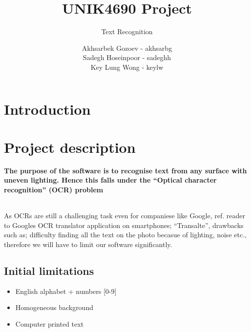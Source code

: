 \documentclass[11pt,a4paper,UKenglish]{article}
\title{UNIK4690 Project}
\subtitle{Text Recognition}
\author{
  Akhsarbek Gozoev  - akhsarbg \\
  Sadegh Hoseinpoor - sadeghh\\
  Key Lung Wong - keylw
}
\begin{document}
\ififorside[kind={}]

\newpage
\tableofcontents
\newpage
\section{Introduction}


\section{Project description}
\textbf{The purpose of the software is to recognise text from any
surface with uneven lighting. Hence this falls under the ``Optical
character recognition'' (OCR) problem}

\noindent \\ As OCRs are still a challenging task even for companiese like
Google, ref. reader to Googles OCR translator application on smartphones;
``Transalte'', drawbacks such as; difficulty finding all the text on the photo
becasue of lighting, noise etc., therefore we will have to limit our software
significantly.


\subsection{Initial limitations}
\begin{itemize}
 \item{English alphabet + numbers [0-9]}
 \item{Homogeneous background}
 \item{Computer printed text}
\end{itemize}
\end{document}
